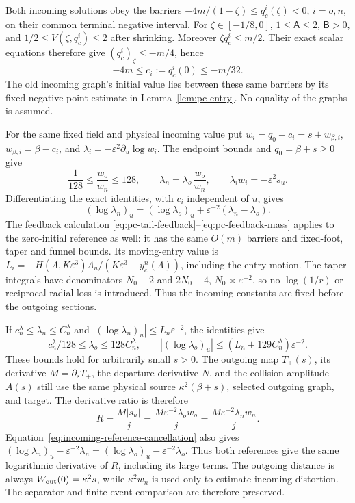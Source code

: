 Both incoming solutions obey the barriers
$-4m/(1-\zeta)\le q_c^i(\zeta)<0$, $i=o,n$, on their
common terminal negative interval. For $\zeta\in[-1/8,0]$,
$1\le\mathsf A\le2$, $\mathsf B>0$, and
$1/2\le V(\zeta,q_c^i)\le2$ after shrinking.
Moreover $\zeta q_c^i\le m/2$. Their exact scalar equations
therefore give $(q_c^i)_\zeta\le-m/4$, hence
\[
 -4m\le c_i:=q_c^i(0)\le-m/32 .
\]
The old incoming graph's initial value lies between these same
barriers by its fixed-negative-point estimate in
Lemma~\ref{lem:pc-entry}. No equality of the graphs is assumed.

For the same fixed field and physical incoming value put
$w_i=q_0-c_i=s+w_{\beta,i}$,
$w_{\beta,i}=\beta-c_i$, and
$\lambda_i=-\varepsilon^2\partial_u\log w_i$.
The endpoint bounds and $q_0=\beta+s\ge0$ give
\[
 \frac1{128}\le\frac{w_o}{w_n}\le128,\qquad
 \lambda_n=\lambda_o\,\frac{w_o}{w_n},\qquad
 \lambda_iw_i=-\varepsilon^2s_u .
\]
Differentiating the exact identities, with $c_i$ independent of $u$,
gives
\begin{equation}\label{eq:incoming-reference-cancellation}
 (\log\lambda_n)_u
 =(\log\lambda_o)_u+
                    \varepsilon^{-2}(\lambda_n-\lambda_o).
\end{equation}
The feedback calculation
\eqref{eq:pc-tail-feedback}--\eqref{eq:pc-feedback-mass} applies to the
zero-initial reference as well: it has the same $O(m)$ barriers and
fixed-foot, taper and funnel bounds. Its moving-entry value is
$L_i=-H(\Lambda,K\varepsilon^3)\Lambda_u/
(K\varepsilon^3-y_c^n(\Lambda))$, including the entry motion.
The taper integrals have denominators $N_0-2$ and $2N_0-4$,
$N_0\asymp\varepsilon^{-2}$, so no $\log(1/r)$ or reciprocal
radial loss is introduced. Thus the incoming constants are fixed
before the outgoing sections.

If $c_n^\lambda\le\lambda_n\le C_n^\lambda$ and
$|(\log\lambda_n)_u|\le L_n\varepsilon^{-2}$, the identities
give
\[
 c_n^\lambda/128\le\lambda_o\le128C_n^\lambda,\qquad
 |(\log\lambda_o)_u|
       \le(L_n+129C_n^\lambda)\varepsilon^{-2}.
\]
These bounds hold for arbitrarily small $s>0$. The outgoing map
$T_+(s)$, its derivative $M=\partial_sT_+$, the departure derivative $N$,
and the collision amplitude $A(s)$ still use the same physical source
$\kappa^2(\beta+s)$, selected outgoing graph, and target. The derivative
ratio is therefore
\[
 R=\frac{M|s_u|}{j}
  =\frac{M\varepsilon^{-2}\lambda_ow_o}{j}
  =\frac{M\varepsilon^{-2}\lambda_nw_n}{j}.
\]
Equation~\eqref{eq:incoming-reference-cancellation} also gives
$(\log\lambda_n)_u-\varepsilon^{-2}\lambda_n
 =(\log\lambda_o)_u-\varepsilon^{-2}\lambda_o$.
Thus both references give the same logarithmic derivative of $R$,
including its large terms. The outgoing distance is always
$W_{\rm out}(0)=\kappa^2s$, while $\kappa^2w_n$ is used only to estimate
incoming distortion. The separator and finite-event comparison are
therefore preserved.



